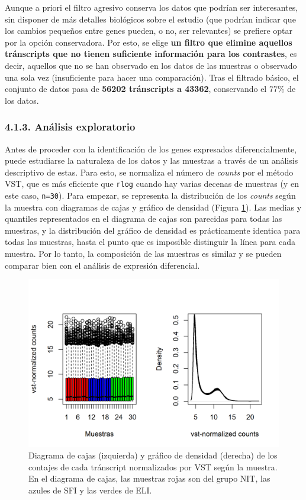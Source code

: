 \documentclass[
]{article}
\begin{document}
Aunque a priori el filtro agresivo conserva los datos que podrían ser
interesantes, sin disponer de más detalles biológicos sobre el estudio
(que podrían indicar que los cambios pequeños entre genes pueden, o no,
ser relevantes) se prefiere optar por la opción conservadora. Por esto,
se elige \textbf{un filtro que elimine aquellos tránscripts que no
tienen suficiente información para los contrastes}, es decir, aquellos
que no se han observado en los datos de las muestras o observado una
sola vez (insuficiente para hacer una comparación). Tras el filtrado
básico, el conjunto de datos pasa de \textbf{56202 tránscripts a 43362},
conservando el \(77\%\) de los datos.

\hypertarget{anuxe1lisis-exploratorio}{%
\subsubsection{4.1.3. Análisis
exploratorio}\label{anuxe1lisis-exploratorio}}

Antes de proceder con la identificación de los genes expresados
diferencialmente, puede estudiarse la naturaleza de los datos y las
muestras a través de un análisis descriptivo de estas. Para esto, se
normaliza el número de \emph{counts} por el método VST, que es más
eficiente que \texttt{rlog} cuando hay varias decenas de muestras (y en
este caso, \texttt{n=30}). Para empezar, se representa la distribución
de los \emph{counts} según la muestra con diagramas de cajas y gráfico
de densidad (Figura \ref{fig:Fig3}). Las medias y quantiles
representados en el diagrama de cajas son parecidas para todas las
muestras, y la distribución del gráfico de densidad es prácticamente
identica para todas las muestras, hasta el punto que es imposible
distinguir la línea para cada muestra. Por lo tanto, la composición de
las muestras es similar y se pueden comparar bien con el análisis de
expresión diferencial.

\begin{figure}

{\centering \includegraphics[width=0.8\linewidth]{results/2.AnaDescript/1.CountDist} 

}

\caption{Diagrama de cajas (izquierda) y gráfico de densidad (derecha) de los contajes de cada tránscript normalizados por VST según la muestra. En el diagrama de cajas, las muestras rojas son del grupo NIT, las azules de SFI y las verdes de ELI. }\label{fig:Fig3}
\end{figure}
\end{document}
